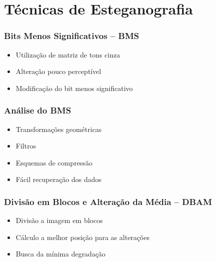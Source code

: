 \documentclass{beamer}
\begin{document}
\section{Técnicas de Esteganografia}
\begin{frame}
\frametitle{Bits Menos Significativos -- BMS}

\begin{itemize}
\item Utilização de matriz de tons cinza\newline
\item Alteração pouco perceptível\newline
\item Modificação do bit menos significativo

\end{itemize}

\end{frame}
\begin{frame}
\frametitle{Análise do BMS}

\begin{itemize}
\item Transformações geométricas\newline
\item Filtros\newline
\item Esquemas de compressão\newline
\item Fácil recuperação dos dados
\end{itemize}

\end{frame}
\begin{frame}
\frametitle{Divisão em Blocos e Alteração da Média -- DBAM}

\begin{itemize}
\item Divisão a imagem em blocos \newline
\item Cálculo a melhor posição para as alterações\newline
\item Busca da mínima degradação 
\end{itemize}
\end{frame}
\end{document}
